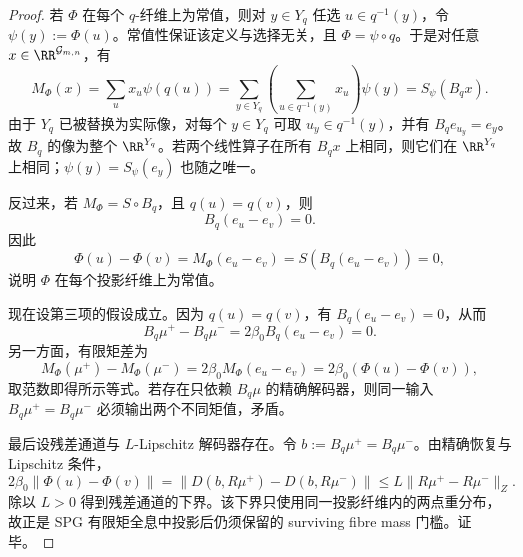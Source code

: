 \begin{proof}
若 \(\Phi\) 在每个 \(q\)-纤维上为常值，则对 \(y\in Y_q\) 任选 \(u\in q^{-1}(y)\)，令 \(\psi(y):=\Phi(u)\)。常值性保证该定义与选择无关，且 \(\Phi=\psi\circ q\)。于是对任意 \(x\in\RR^{\mathcal G_{m,n}}\)，有
\[
M_\Phi(x)=\sum_{u}x_u\psi(q(u))
=\sum_{y\in Y_q}\left(\sum_{u\in q^{-1}(y)}x_u\right)\psi(y)
=S_\psi(B_qx).
\]
由于 \(Y_q\) 已被替换为实际像，对每个 \(y\in Y_q\) 可取 \(u_y\in q^{-1}(y)\)，并有 \(B_qe_{u_y}=e_y\)。故 \(B_q\) 的像为整个 \(\RR^{Y_q}\)。若两个线性算子在所有 \(B_qx\) 上相同，则它们在 \(\RR^{Y_q}\) 上相同；\(\psi(y)=S_\psi(e_y)\) 也随之唯一。

反过来，若 \(M_\Phi=S\circ B_q\)，且 \(q(u)=q(v)\)，则
\[
B_q(e_u-e_v)=0.
\]
因此
\[
\Phi(u)-\Phi(v)=M_\Phi(e_u-e_v)=S(B_q(e_u-e_v))=0,
\]
说明 \(\Phi\) 在每个投影纤维上为常值。

现在设第三项的假设成立。因为 \(q(u)=q(v)\)，有 \(B_q(e_u-e_v)=0\)，从而
\[
B_q\mu^+-B_q\mu^-=2\beta_0B_q(e_u-e_v)=0.
\]
另一方面，有限矩差为
\[
M_\Phi(\mu^+)-M_\Phi(\mu^-)
=2\beta_0M_\Phi(e_u-e_v)
=2\beta_0(\Phi(u)-\Phi(v)),
\]
取范数即得所示等式。若存在只依赖 \(B_q\mu\) 的精确解码器，则同一输入 \(B_q\mu^+=B_q\mu^-\) 必须输出两个不同矩值，矛盾。

最后设残差通道与 \(L\)-Lipschitz 解码器存在。令 \(b:=B_q\mu^+=B_q\mu^-\)。由精确恢复与 Lipschitz 条件，
\[
2\beta_0\|\Phi(u)-\Phi(v)\|
=\|D(b,R\mu^+)-D(b,R\mu^-)\|
\le L\|R\mu^+-R\mu^-\|_Z.
\]
除以 \(L>0\) 得到残差通道的下界。该下界只使用同一投影纤维内的两点重分布，故正是 SPG 有限矩全息中投影后仍须保留的 surviving fibre mass 门槛。证毕。
\end{proof}

